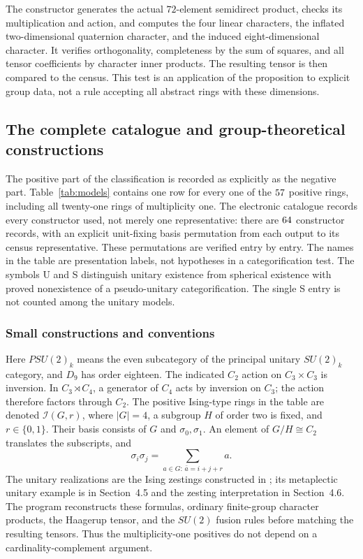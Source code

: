 The constructor generates the actual $72$-element semidirect product,
checks its multiplication and action, and computes the four linear
characters, the inflated two-dimensional quaternion character, and
the induced eight-dimensional character. It verifies orthogonality,
completeness by the sum of squares, and all tensor coefficients by
character inner products. The resulting tensor is then compared to the
census. This test is an application of the proposition to explicit
group data, not a rule accepting all abstract rings with these dimensions.

\subsection{The complete catalogue and group-theoretical constructions}\label{sec:model-catalogue}
The positive part of the classification is recorded as explicitly as the
negative part. Table~\ref{tab:models} contains one row for every one of the
$57$ positive rings, including all twenty-one rings of
multiplicity one. The electronic catalogue records every constructor used,
not merely one representative: there are $64$ constructor records,
with an explicit unit-fixing basis permutation from each output to its
census representative. These permutations are verified entry by entry.
The names in the table are presentation labels, not hypotheses in a
categorification test. The symbols U and S distinguish unitary existence
from spherical existence with proved nonexistence of a pseudo-unitary
categorification. The single S entry is not counted among the unitary
models.

\subsubsection{Small constructions and conventions}
Here $PSU(2)_k$ means the even subcategory of the principal unitary
$SU(2)_k$ category, and $D_9$ has order eighteen. The indicated $C_2$ action
on $C_3\times C_3$ is inversion. In $C_3\rtimes C_4$, a generator of $C_4$
acts by inversion on $C_3$; the action therefore factors through $C_2$.
The positive Ising-type rings in the table are denoted $\mathcal I(G,r)$,
where $|G|=4$, a subgroup $H$ of order two is fixed, and $r\in\{0,1\}$.
Their basis consists of $G$ and $\sigma_0,\sigma_1$. An element of
$G/H\cong C_2$ translates the subscripts, and
\[
 \sigma_i\sigma_j=\sum_{a\in G:\,\bar a=i+j+r}a.
\]
The unitary realizations are the Ising zestings constructed in
\cite[Section~4.3]{LPR}; its metaplectic unitary example is in
Section~4.5 and the zesting interpretation in Section~4.6. The program reconstructs these formulas,
ordinary finite-group character products, the Haagerup tensor, and the
$SU(2)$ fusion rules before matching the resulting tensors. Thus the
multiplicity-one positives do not depend on a cardinality-complement
argument.

